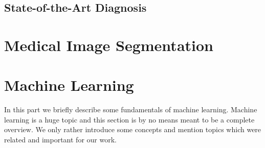 \subsection{State-of-the-Art Diagnosis}

\section{Medical Image Segmentation} \label{sec:intro_mia} %

\section{Machine Learning} \label{sec:intro_mlearn} %
In this part we briefly describe some fundamentals of machine learning. Machine learning is a huge topic and this section is by no means meant to be a complete overview. We only rather introduce some concepts and mention topics which were related and important for our work.

